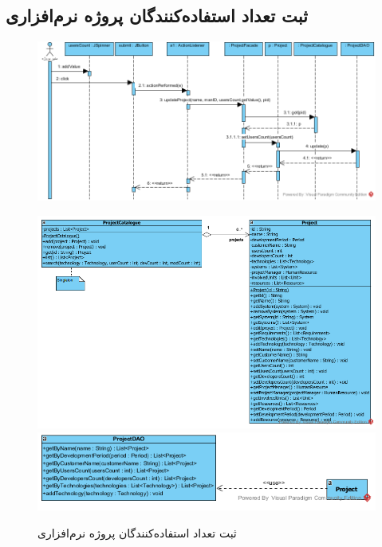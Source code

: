 \begin{landscape}
\newpage
\section{ثبت تعداد استفاده‌کنندگان پروژه نرم‌افزاری}
\begin{figure}[H]
	\centering
	\includegraphics[scale=0.8]{img/sequence-design/AddUsersCount}
\end{figure}
\begin{figure}[H]
	\centering
	\includegraphics[scale=0.6]{img/sequence-design/AddUsersCountC}
	\includegraphics[scale=0.6]{img/sequence-design/AddUsersCountD}
	\caption{ثبت تعداد استفاده‌کنندگان پروژه نرم‌افزاری}
\end{figure}


\end{landscape}
